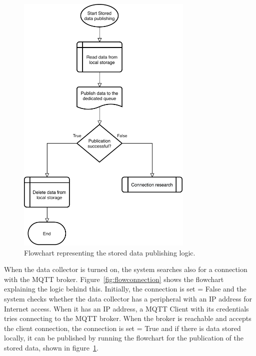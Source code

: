 \begin{figure}[h!]
\begin{minipage}[b]{8.5cm}
\includegraphics[width=0.75\textwidth]{images/flowstorage}
\caption{Flowchart representing the stored data publishing logic.}
\label{fig:flowstorage}
\end{minipage}
\end{figure}


When the data collector is turned on, the system searches also for a connection with the MQTT broker. Figure~\ref{fig:flowconnection} shows the flowchart explaining the logic behind this. Initially, the connection is set = False and the system checks whether the data collector has a peripheral with an IP address for Internet access.
When it has an IP address, a MQTT Client with its credentials tries connecting to the MQTT broker. When the broker is reachable and accepts the client connection, the connection is set = True and if there is data stored locally, it can be published by running the flowchart for the publication of the stored data, shown in figure~\ref{fig:flowstorage}.

